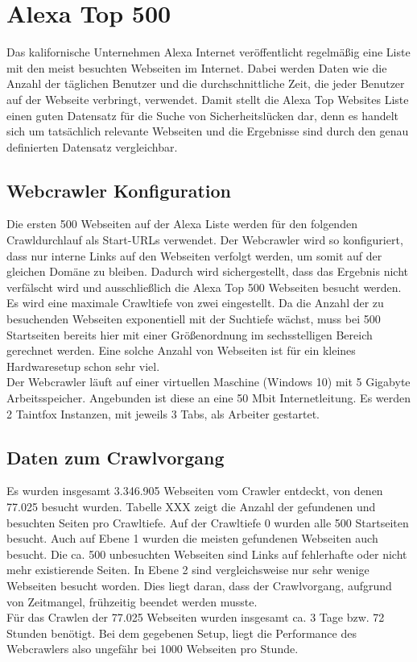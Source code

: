 \section{Alexa Top 500}
Das kalifornische Unternehmen Alexa Internet veröffentlicht regelmäßig eine Liste mit den meist besuchten Webseiten im Internet. Dabei werden Daten wie die Anzahl der täglichen Benutzer und die durchschnittliche Zeit, die jeder Benutzer auf der Webseite verbringt, verwendet. Damit stellt die Alexa Top Websites Liste einen guten Datensatz für die Suche von Sicherheitslücken dar, denn es handelt sich um tatsächlich relevante Webseiten und die Ergebnisse sind durch den genau definierten Datensatz vergleichbar.\\
\subsection{Webcrawler Konfiguration}
Die ersten 500 Webseiten auf der Alexa Liste werden für den folgenden Crawldurchlauf als Start-URLs verwendet. Der Webcrawler wird so konfiguriert, dass nur interne Links auf den Webseiten verfolgt werden, um somit auf der gleichen Domäne zu bleiben. Dadurch wird sichergestellt, dass das Ergebnis nicht verfälscht wird und ausschließlich die Alexa Top 500 Webseiten besucht werden. \\
Es wird eine maximale Crawltiefe von zwei eingestellt. Da die Anzahl der zu besuchenden Webseiten exponentiell mit der Suchtiefe wächst, muss bei 500 Startseiten bereits hier mit einer Größenordnung im sechsstelligen Bereich gerechnet werden. Eine solche Anzahl von Webseiten ist für ein kleines Hardwaresetup schon sehr viel.\\
Der Webcrawler läuft auf einer virtuellen Maschine (Windows 10) mit 5 Gigabyte Arbeitsspeicher. Angebunden ist diese an eine 50 Mbit Internetleitung. Es werden 2 Taintfox Instanzen, mit jeweils 3 Tabs, als Arbeiter gestartet.
\subsection{Daten zum Crawlvorgang}
Es wurden insgesamt 3.346.905 Webseiten vom Crawler entdeckt, von denen 77.025 besucht wurden. Tabelle XXX zeigt die Anzahl der gefundenen und besuchten Seiten pro Crawltiefe. Auf der Crawltiefe 0 wurden alle 500 Startseiten besucht. Auch auf Ebene 1 wurden die meisten gefundenen Webseiten auch besucht. Die ca. 500 unbesuchten Webseiten sind Links auf fehlerhafte oder nicht mehr existierende Seiten. In Ebene 2 sind vergleichsweise nur sehr wenige Webseiten besucht worden. Dies liegt daran, dass der Crawlvorgang, aufgrund von Zeitmangel, frühzeitig beendet werden musste. \\
Für das Crawlen der 77.025 Webseiten wurden insgesamt ca. 3 Tage bzw. 72 Stunden benötigt. Bei dem gegebenen Setup, liegt die Performance des Webcrawlers also ungefähr bei 1000 Webseiten pro Stunde.

